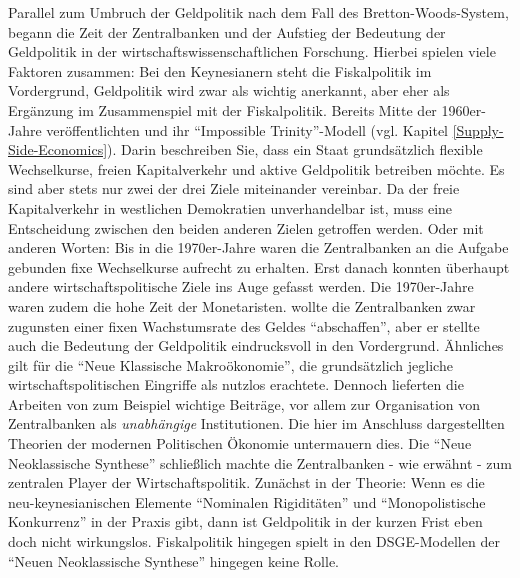 Parallel zum Umbruch der Geldpolitik nach dem Fall des Bretton-Woods-System, begann die Zeit der Zentralbanken und der Aufstieg der Bedeutung der Geldpolitik in der wirtschaftswissenschaftlichen Forschung. Hierbei spielen viele Faktoren zusammen: Bei den Keynesianern steht die Fiskalpolitik im Vordergrund, Geldpolitik wird zwar als wichtig anerkannt, aber eher als Ergänzung im Zusammenspiel mit der Fiskalpolitik. Bereits Mitte der 1960er-Jahre veröffentlichten \textcite{Mundell1963} und \textcite{Fleming1962} ihr "`Impossible Trinity"'-Modell (vgl. Kapitel \ref{Supply-Side-Economics}). Darin beschreiben Sie, dass ein Staat grundsätzlich flexible Wechselkurse, freien Kapitalverkehr und aktive Geldpolitik betreiben möchte. Es sind aber stets nur zwei der drei Ziele miteinander vereinbar. Da der freie Kapitalverkehr in westlichen Demokratien unverhandelbar ist, muss eine Entscheidung zwischen den beiden anderen Zielen getroffen werden. Oder mit anderen Worten: Bis in die 1970er-Jahre waren die Zentralbanken an die Aufgabe gebunden fixe Wechselkurse aufrecht zu erhalten. Erst danach konnten überhaupt andere wirtschaftspolitische Ziele ins Auge gefasst werden. Die 1970er-Jahre waren zudem die hohe Zeit der Monetaristen. \textcite{Friedman1968, Friedman1976b} wollte die Zentralbanken zwar zugunsten einer fixen Wachstumsrate des Geldes "`abschaffen"', aber er stellte auch die Bedeutung der Geldpolitik eindrucksvoll in den Vordergrund. Ähnliches gilt für die "`Neue Klassische Makroökonomie"', die grundsätzlich jegliche wirtschaftspolitischen Eingriffe als nutzlos erachtete. Dennoch lieferten die Arbeiten von zum Beispiel \textcite{Kydland1977, Barro1976} wichtige Beiträge, vor allem zur Organisation von Zentralbanken als \textit{unabhängige} Institutionen. Die hier im Anschluss dargestellten Theorien der modernen Politischen Ökonomie untermauern dies. Die "`Neue Neoklassische Synthese"' schließlich machte die Zentralbanken - wie erwähnt - zum zentralen Player der Wirtschaftspolitik. Zunächst in der Theorie: Wenn es die neu-keynesianischen Elemente "`Nominalen Rigiditäten"' und "`Monopolistische Konkurrenz"' in der Praxis gibt, dann ist Geldpolitik in der kurzen Frist eben doch nicht wirkungslos. Fiskalpolitik hingegen spielt in den DSGE-Modellen der "`Neuen Neoklassische Synthese"' hingegen keine Rolle.


